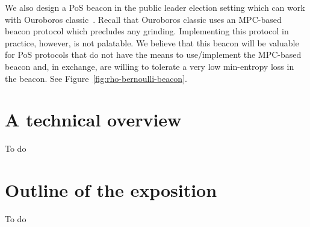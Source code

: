 We also design a PoS beacon in the public leader election setting 
which can work with Ouroboros classic~\cite{Ouroboros}. 
Recall that Ouroboros classic uses an MPC-based beacon protocol 
which precludes any grinding. 
Implementing this protocol in practice, however, is not palatable. 
We believe that this beacon will be valuable for 
PoS protocols 
that do not have the means to use/implement the MPC-based beacon 
and, in exchange, are willing to tolerate a very low min-entropy loss 
in the beacon. 
See Figure~\ref{fig:rho-bernoulli-beacon}.



\section{A technical overview}
To do



\section{Outline of the exposition}
To do




